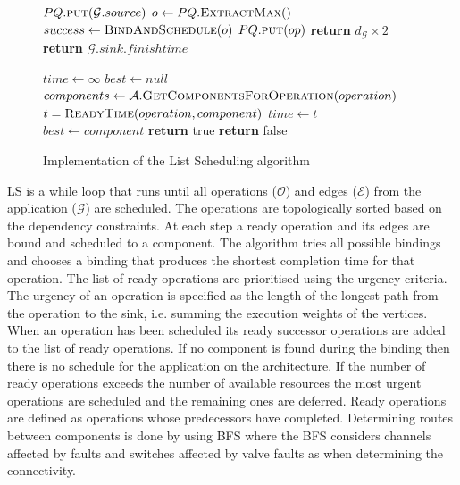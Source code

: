 \begin{figure}
\centering
\begin{algorithmic}[1]
	\State $PQ.\Call{put}{\mathcal{G}.source}$
        \State $o \gets PQ.\Call{ExtractMax}{\null}$
	\State $success \gets \Call{BindAndSchedule}{o}$
			\State $PQ.\Call{put}{op}$
		\EndFor
	\Else
		\State \textbf{return} $d_\mathcal{G} \times 2$ 
	\EndIf
      \EndWhile
	\State \textbf{return} $\mathcal{G}.sink.finishtime$
    \EndFunction

	\State $time \gets \infty$
	\State $best \gets null$
	\State $components \gets \mathcal{A}.\Call{GetComponentsForOperation}{operation}$
		\State $t = \Call{ReadyTime}{operation, component}$
			\State $time \gets t$
			\State $best \gets component$
		\EndIf
		\State {}
		\State \textbf{return} true
	\Else
		\State \textbf{return} false
	\EndIf
	\EndFor
\EndFunction
\end{algorithmic}
\caption[Implementation of the List Scheduling algorithm]{Implementation of the List Scheduling algorithm}
\label{alg:list-scheduling}
\end{figure}

LS is a while loop that runs until all operations ($\mathcal{O}$) and edges ($\mathcal{E}$) from the application ($\mathcal{G}$) are scheduled. The operations are topologically sorted based on the dependency constraints. At each step a ready operation and its edges are bound and scheduled to a component. The algorithm tries all possible bindings and chooses a binding that produces the shortest completion time for that operation. The list of ready operations are prioritised using the urgency criteria. The urgency of an operation is specified as the length of the longest path from the operation to the sink, i.e. summing the execution weights of the vertices. When an operation has been scheduled its ready successor operations are added to the list of ready operations. If no component is found during the binding then there is no schedule for the application on the architecture. If the number of ready operations exceeds the number of available resources the most urgent operations are scheduled and the remaining ones are deferred. Ready operations are defined as operations whose predecessors have completed. Determining routes between components is done by using BFS where the BFS considers channels affected by faults and switches affected by valve faults as when determining the connectivity.

